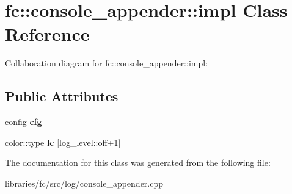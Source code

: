 \hypertarget{classfc_1_1console__appender_1_1impl}{}\section{fc\+:\+:console\+\_\+appender\+:\+:impl Class Reference}
\label{classfc_1_1console__appender_1_1impl}


Collaboration diagram for fc\+:\+:console\+\_\+appender\+:\+:impl\+:
\subsection*{Public Attributes}
\begin{DoxyCompactItemize}
\item 
\mbox{\label{classfc_1_1console__appender_1_1impl_a2fc97c332cff29837eb16c2218704723}} 
\mbox{\hyperlink{structfc_1_1console__appender_1_1config}{config}} {\bfseries cfg}
\item 
\mbox{\label{classfc_1_1console__appender_1_1impl_af44d61eb9751176bee7d6a506a923ca6}} 
color\+::type {\bfseries lc} \mbox{[}log\+\_\+level\+::off+1\mbox{]}
\end{DoxyCompactItemize}


The documentation for this class was generated from the following file\+:\begin{DoxyCompactItemize}
\item 
libraries/fc/src/log/console\+\_\+appender.\+cpp\end{DoxyCompactItemize}
